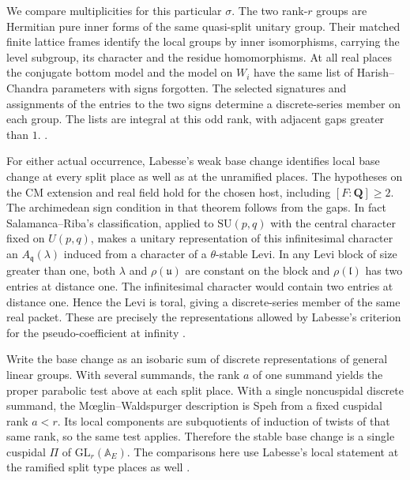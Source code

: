 We compare multiplicities for this particular \(\sigma\).
The two rank-\(r\) groups are Hermitian pure inner forms of the
same quasi-split unitary group. Their matched finite lattice
frames identify the local groups by inner isomorphisms, carrying
the level subgroup, its character and the residue homomorphisms.
At all real places the conjugate bottom model and the model on
\(W_i\) have the same list of Harish--Chandra parameters with
signs forgotten. The selected signatures and assignments of
the entries to the two signs determine a discrete-series member
on each group. The lists are integral at this odd rank, with
adjacent gaps greater than \(1\).
.

For either actual occurrence, Labesse's weak base change
identifies local base change at every split place as well as
at the unramified places. The hypotheses on the CM extension
and real field hold for the chosen host, including
\([F:\mathbf Q]\ge 2\). The archimedean sign condition in that
theorem follows from the gaps. In fact Salamanca--Riba's
classification, applied to \(\mathrm{SU}(p,q)\) with the central
character fixed on \(U(p,q)\), makes a unitary representation
of this infinitesimal character an \(A_{\mathfrak q}(\lambda)\)
induced from a character of a \(\theta\)-stable Levi. In any Levi
block of size greater than one, both \(\lambda\) and
\(\rho(\mathfrak u)\) are constant on the block and
\(\rho(\mathfrak l)\) has two entries at distance one. The
infinitesimal character would contain two entries at distance
one. Hence the Levi is toral, giving a discrete-series member
of the same real packet. These are precisely the representations
allowed by Labesse's criterion for the pseudo-coefficient at
infinity \cite{rank-labesse,rank-salamanca}.

Write the base change as an isobaric sum of discrete
representations of general linear groups. With several summands,
the rank \(a\) of one summand yields the proper parabolic
test above at each split place. With a single noncuspidal
discrete summand, the M\oe glin--Waldspurger description is
Speh from a fixed cuspidal rank \(a<r\). Its local components
are subquotients of induction of twists of that same rank,
so the same test applies. Therefore the stable base change is
a single cuspidal \(\Pi\) of \(\mathrm{GL}_r(\mathbb A_E)\).
The comparisons here use Labesse's local statement at the
ramified split type places as well \cite{rank-labesse,rank-moeglin}.

